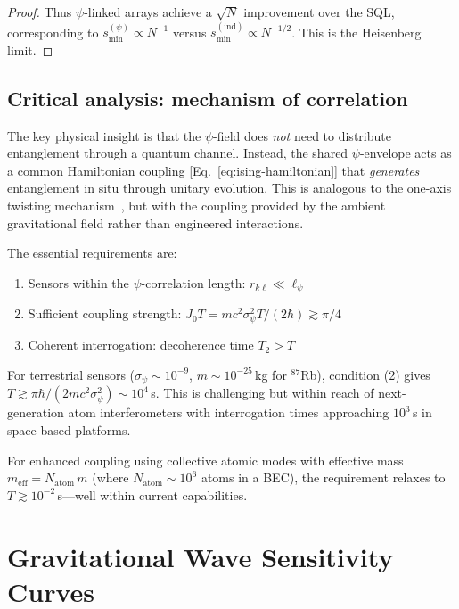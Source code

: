\documentclass[aps,prl,twocolumn,superscriptaddress,showpacs]{revtex4-2}
\theoremstyle{definition}
\begin{document}
\begin{proof}
Thus $\psi$-linked arrays achieve a $\sqrt{N}$ improvement over the
SQL, corresponding to $s_{\min}^{(\psi)} \propto N^{-1}$ versus
$s_{\min}^{(\mathrm{ind})} \propto N^{-1/2}$. This is the Heisenberg limit.
\end{proof}

\subsection{Critical analysis: mechanism of correlation}

The key physical insight is that the $\psi$-field does \emph{not}
need to distribute entanglement through a quantum channel. Instead,
the shared $\psi$-envelope acts as a common Hamiltonian coupling
[Eq.~\eqref{eq:ising-hamiltonian}] that \emph{generates} entanglement
in situ through unitary evolution. This is analogous to the one-axis
twisting mechanism~\cite{Kitagawa1993}, but with the coupling provided
by the ambient gravitational field rather than engineered interactions.

The essential requirements are:
\begin{enumerate}
\item Sensors within the $\psi$-correlation length:
$r_{k\ell} \ll \ell_\psi$
\item Sufficient coupling strength:
$J_0 T = mc^2\sigma_\psi^2 T/(2\hbar) \gtrsim \pi/4$
\item Coherent interrogation: decoherence time $T_2 > T$
\end{enumerate}

For terrestrial sensors ($\sigma_\psi \sim 10^{-9}$, $m \sim 10^{-25}$\,kg
for $^{87}$Rb), condition (2) gives $T \gtrsim \pi\hbar/(2mc^2\sigma_\psi^2)
\sim 10^4$\,s. This is challenging but within reach of next-generation
atom interferometers with interrogation times approaching $10^3$\,s in
space-based platforms.

For enhanced coupling using collective atomic modes with effective mass
$m_{\mathrm{eff}} = N_{\mathrm{atom}}\,m$ (where $N_{\mathrm{atom}} \sim 10^6$
atoms in a BEC), the requirement relaxes to
$T \gtrsim 10^{-2}$\,s---well within current capabilities.

\section{Gravitational Wave Sensitivity Curves}\label{sec:gw-curves}
\end{document}
